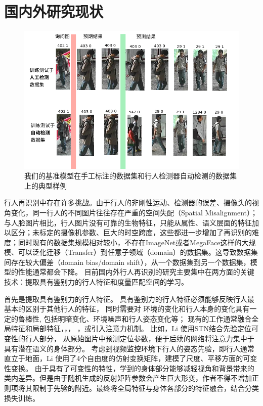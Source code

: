 \section{国内外研究现状}

\begin{figure}
	\centering
	\includegraphics[width=\textwidth]{fig/2018-04-18-21-53-15.png}
	\caption{我们的基准模型在手工标注的数据集和行人检测器自动检测的数据集上的典型样例} \label{fig:label2det}
\end{figure}

行人再识别中存在许多挑战。由于行人的非刚性运动、检测器的误差、摄像头的视角变化，同一行人的不同图片往往存在严重的空间失配（Spatial Misalignment）；与人脸图片相比，行人图片没有可靠的生物特征，只能从属性、语义层面的特征加以区分；未标定的摄像机参数、巨大的时空跨度，这些都进一步增加了再识别的难度；同时现有的数据集规模相对较小，不存在ImageNet或者MegaFace这样的大规模、可以泛化迁移（Transfer）到任意子领域（domain）的数据集。这导致数据集间存在较大偏差（domain bias/domain shift），从一个数据集到另一个数据集，模型的性能通常都会下降。
目前国内外行人再识别的研究主要集中在两方面的关键技术：提取具有鉴别力的行人特征和度量匹配空间的学习。

首先是提取具有鉴别力的行人特征。
具有鉴别力的行人特征必须能够反映行人最基本的区别于其他行人的特征，
同时需要对
环境的变化和行人本身的变化具有一定的鲁棒性,
包括明暗变化、环境噪声和行人姿态变化等；
现有的工作通常融合全局特征和局部特征\cite{reciprocal}，\cite{liu2017hydraplus}，\cite{zhao2017spindle}，
\cite{glad}，或引入注意力机制。
比如，Li \etal \cite{latent}使用STN结合先验定位可变性的行人部分，
从原始图片中预测定位参数，便于后续的网络将注意力集中于具有潜在语义的身体部分。
考虑到视频监控环境下行人的姿态先验，即行人通常直立于地面，Li \etal 
使用了4个自由度的仿射变换矩阵，建模了尺度、平移方面的可变性变换。
由于具有了可变性的特性，学到的身体部分能够减轻视角和背景带来的类内差异。但是由于随机生成的反射矩阵参数会产生巨大形变，作者不得不增加正则项将其限制于先验的附近。最终将全局特征与身体各部分的特征融合，结合分类损失训练。


